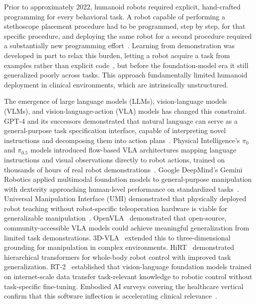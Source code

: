 Prior to approximately 2022, humanoid robots required explicit, hand-crafted
programming for every behavioral task.
A robot capable of performing a
stethoscope placement procedure had to be programmed, step by step, for that
specific procedure, and deploying the same robot for a second procedure required
a substantially new programming effort~\cite{billard2008robot,schaal1999imitation}.
Learning from demonstration was developed in part to relax this burden, letting a
robot acquire a task from examples rather than explicit
code~\cite{argall2009survey,ravichandar2020recent}, but before the foundation-model
era it still generalized poorly across tasks. This approach fundamentally limited
humanoid deployment in clinical environments, which are intrinsically
unstructured.

The emergence of large language models (LLMs), vision-language models (VLMs), and
vision-language-action (VLA) models has changed this constraint.
GPT-4 and its successors demonstrated that natural language can serve as a
general-purpose task specification interface, capable of interpreting novel
instructions and decomposing them into action plans~\cite{openai2023gpt4}.
Physical Intelligence's $\pi_0$ and $\pi_{0.5}$ models introduced flow-based
VLA architectures mapping language instructions and visual observations directly
to robot actions, trained on thousands of hours of real robot
demonstrations~\cite{black2024pi0}. Google DeepMind's Gemini Robotics applied
multimodal foundation models to general-purpose manipulation with dexterity
approaching human-level performance on standardized
tasks~\cite{geminiroboticsTeam2025}. Universal Manipulation Interface (UMI)
demonstrated that physically deployed robot teaching without robot-specific
teleoperation hardware is viable for generalizable
manipulation~\cite{chi2024umi}. OpenVLA~\cite{kim2024openvla} demonstrated
that open-source, community-accessible VLA models could achieve meaningful
generalization from limited task demonstrations. 3D-VLA~\cite{zhen20243dvla}
extended this to three-dimensional grounding for manipulation in complex
environments. HiRT~\cite{wen2024hirt} demonstrated hierarchical transformers
for whole-body robot control with improved task generalization. RT-2~\cite{brohan2023rt2}
established that vision-language foundation models trained on internet-scale
data transfer task-relevant knowledge to robotic control without task-specific
fine-tuning. Embodied AI surveys covering the healthcare vertical confirm that
this software inflection is accelerating clinical
relevance~\cite{liu2025screens,mir2026embodied,lisondra2026embodied}.

